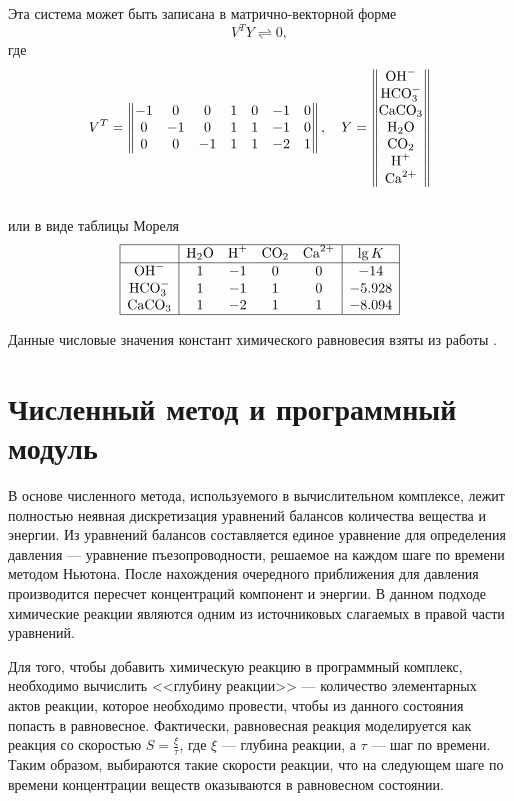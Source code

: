 \documentclass[14pt,a4paper]{extarticle}
\begin{document}
Эта  система может быть записана в матрично-векторной форме $$V^T Y \rightleftharpoons 0,$$ где
$$V^T =  \begin{Vmatrix}
-1 &0 &0  &1 &0 &-1 &0\\
0 &-1 &0  &1 &1 &-1 &0\\
0  &0 &-1  &1 &1 &-2 &1
		\end{Vmatrix}, \quad
  Y = \begin{Vmatrix}
  \text{OH}^-\\
  \text{HCO}_3^{-}\\
  \text{CaCO}_3\\
  \text{H}_2\text{O}\\
  \text{CO}_2\\
  \text{H}^+\\
  \text{Ca}^{2+}
  \end{Vmatrix}$$\\
или в виде таблицы Мореля\\
$$\begin{array}{|c|cccc|c|}
\hline
		&\text{H}_2\text{O}	&\text{H}^+	&\text{CO}_2	&\text{Ca}^{2+}	&\lg {K}\\
\hline
\text{OH}^-		&1		&-1		&0		  &0		&-14\\
\text{HCO}_3^{-}	&1		&-1		&1		  &0		&-5.928\\
\text{CaCO}_3		&1		&-2		&1		  &1		&-8.094\\
\hline
\end{array}$$

Данные числовые значения констант химического равновесия взяты из работы \cite{vostrikov}.

\clearpage
\section{Численный метод и программный модуль}

В основе численного метода, используемого в вычислительном комплексе, лежит полностью неявная дискретизация уравнений балансов количества вещества и энергии. Из уравнений балансов составляется единое уравнение для определения давления --- уравнение пъезопроводности, решаемое на каждом шаге по времени методом Ньютона. После нахождения очередного приближения для давления производится пересчет концентраций компонент и энергии. В данном подходе химические реакции являются одним из источниковых слагаемых в правой части уравнений.

Для того, чтобы добавить химическую реакцию в программный комплекс, необходимо вычислить <<глубину реакции>> --- количество элементарных актов реакции, которое необходимо провести, чтобы из данного состояния попасть в равновесное. Фактически, равновесная реакция моделируется как реакция со скоростью $S = \frac{\xi}{\tau}$, где $\xi$ --- глубина реакции, а $\tau$ --- шаг по времени. Таким образом, выбираются такие скорости реакции, что на следующем шаге по времени концентрации веществ оказываются в равновесном состоянии.
\end{document}
